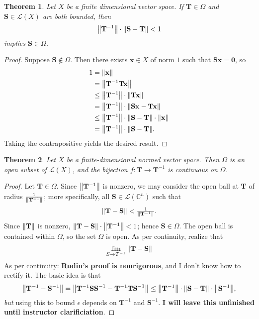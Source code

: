 \documentclass[11pt]{article}
\renewcommand{\vec}[1]{\mathbf{#1}}
\newcommand{\mat}[1]{\mathbf{#1}}
\newtheorem{theorem}{Theorem}
\begin{document}
\begin{theorem}
	Let $X$ be a finite dimensional vector space. If $\mat{T} \in \Omega$ and $\mat{S} \in \mathcal{L}(X)$ are both bounded, then
	\[
		\norm{\mat{T}^{-1}} \cdot \norm{\mat{S} - \mat{T}} < 1
	\]
	implies $\mat{S} \in \Omega$.
\end{theorem}
\begin{adjustwidth}{0.5cm}{}
	\begin{proof}
		Suppose $\mat{S} \notin \Omega$. Then there exists $\vec{x} \in X$ of norm $1$ such that $\mat{S} \vec{x} = \vec{0}$, so
		\begin{align*}
			1 &= \norm{\vec{x}} \\
			&= \norm{\mat{T}^{-1}\mat{T} \vec{x}} \\
			&\le \norm{\mat{T}^{-1}} \cdot \norm{\mat{T} \vec{x}} \\
			&= \norm{\mat{T}^{-1}} \cdot \norm{\mat{S} \vec{x} - \mat{T} \vec{x}} \\
			&\le \norm{\mat{T}^{-1}} \cdot \norm{\mat{S} - \mat{T}} \cdot \norm{\vec{x}} \\
			&= \norm{\mat{T}^{-1}} \cdot \norm{\mat{S} - \mat{T}}.
		\end{align*}
		Taking the contrapositive yields the desired result.
	\end{proof}
\end{adjustwidth}

\newpage

\begin{theorem}
	Let $X$ be a finite-dimensional normed vector space. Then $\Omega$ is an open subset of $\mathcal{L}(X)$, and the bijection $f : \mat{T} \to \mat{T}^{-1}$ is continuous on $\Omega$.
\end{theorem}
\begin{adjustwidth}{0.5cm}{}
	\begin{proof}
		Let $\mat{T} \in \Omega$. Since $\norm{\mat{T}^{-1}}$ is nonzero, we may consider the open ball at $\mat{T}$ of radius $\tfrac{1}{\norm{\mat{T}^{-1}}}$; more specifically, all $\mat{S} \in \mathcal{L}(\mathbb{C}^{n})$ such that
		\[
			\norm{\mat{T} - \mat{S}} < \tfrac{1}{\norm{\mat{T}^{-1}}}.
		\]
		Since $\norm{\mat{T}}$ is nonzero, $\norm{\mat{T} - \mat{S}} \cdot \norm{\mat{T}^{-1}} < 1$; hence $\mat{S} \in \Omega$. The open ball is contained within $\Omega$, so the set $\Omega$ is open. As per continuity, realize that
		\[
			\lim\limits_{S \to T^{-1}} \norm{\mat{T} - \mat{S}}
		\]
		As per continuity: \textbf{Rudin's proof is nonrigorous}, and I don't know how to rectify it. The basic idea is that
		\[
			\norm{\mat{T}^{-1} - \mat{S}^{-1}} = \norm{\mat{T}^{-1}\mat{SS}^{-1} - \mat{T}^{-1}\mat{TS}^{-1}} \le \norm{\mat{T}^{-1}} \cdot \norm{\mat{S} - \mat{T}} \cdot \norm{\mat{S}^{-1}},
		\]
		\textit{but} using this to bound $\epsilon$ depends on $\mat{T}^{-1}$ and $\mat{S}^{-1}$. \textbf{I will leave this unfinished until instructor clarificiation}.
	\end{proof}
\end{adjustwidth}
\end{document}
